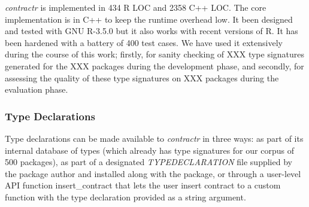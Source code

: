 \documentclass[acmsmall,review,anonymous]{acmart}\settopmatter{printfolios=true,printccs=false,printacmref=false}
\newcommand{\contractr}{\emph{contractr}\xspace} %
\begin{document}
\contractr is implemented in 434 R LOC and 2358 C++ LOC. The core
implementation is in C++ to keep the runtime overhead low. It been designed and
tested with GNU R-3.5.0 but it also works with recent versions of R. It has been
hardened with a battery of 400 test cases. We have used it extensively during
the course of this work; firstly, for sanity checking of XXX type signatures
generated for the XXX packages during the development phase, and secondly, for
assessing the quality of these type signatures on XXX packages during the
evaluation phase.

%
%
\subsubsection{Type Declarations}
Type declarations can be made available to \contractr in three ways: as
part of its internal database of types (which already has type signatures for
our corpus of 500 packages), as part of a designated \emph{TYPEDECLARATION} file
supplied by the package author and installed along with the package, or through
a user-level API function insert\_contract that lets the user insert contract to
a custom function with the type declaration provided as a string argument.

%
%
\end{document}
